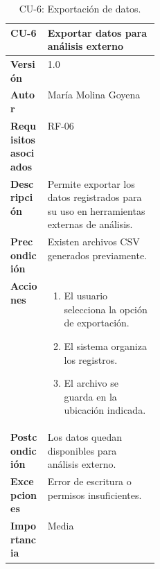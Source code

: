 \begin{table}[p]
\centering
\begin{tabularx}{\linewidth}{p{0.25\linewidth} X}
\toprule
\textbf{CU-6} & Exportar datos para análisis externo \\
\midrule
\textbf{Versión} & 1.0 \\
\textbf{Autor} & María Molina Goyena \\
\textbf{Requisitos asociados} & RF-06 \\
\textbf{Descripción} & Permite exportar los datos registrados para su uso en herramientas externas de análisis. \\
\textbf{Precondición} & Existen archivos CSV generados previamente. \\
\textbf{Acciones} &
\begin{minipage}[t]{\linewidth}
\begin{enumerate}
    \item El usuario selecciona la opción de exportación.
    \item El sistema organiza los registros.
    \item El archivo se guarda en la ubicación indicada.
\end{enumerate}
\end{minipage} \\
\textbf{Postcondición} & Los datos quedan disponibles para análisis externo. \\
\textbf{Excepciones} & Error de escritura o permisos insuficientes. \\
\textbf{Importancia} & Media \\
\bottomrule
\end{tabularx}
\caption{CU-6: Exportación de datos.}
\label{tab:cu6}
\end{table}

